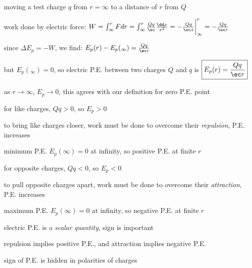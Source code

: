 moving a test charge $q$ from $r=\infty$ to a distance of $r$ from $Q$

\begin{center}
\end{center}

work done by electric force: $W=\int^r_\infty F dr = \int^r_\infty \frac{Qq}{\ec} \frac{\dd x}{x^2} = - \frac{Qq}{\ec x}\bigg|^r_\infty = - \frac{Qq}{\ec r} $

\eqyskip

since $\Delta E_p=-W$, we find: $E_p(r) - E_p(_\infty) = \frac{Qq}{\ec r}$

but $E_p(_\infty) = 0$,  so electric P.E. between two charges $Q$ and $q$ is $\boxed{E_p(r) = \frac{Qq}{\ec r}}$

\cmt as $r \to \infty$, $E_p \to 0$, this agrees with our definition for zero P.E. point

\cmt for like charges, $Qq > 0$, so $E_p > 0$

to bring like charges closer, work must be done to overcome their \emph{repulsion}, P.E. increases

minimum P.E. $E_p(\infty)=0$ at infinity, so positive P.E. at finite $r$

\cmt for opposite charges, $Qq < 0$, so $E_p < 0$

to pull opposite charges apart, work must be done to overcome their \emph{attraction}, P.E. increases

maximum P.E. $E_p(\infty)=0$ at infinity, so negative P.E. at finite $r$

\cmt electric P.E. is a \emph{scalar quantity}, sign is important

repulsion implies positive P.E., and attraction implies negative P.E.

sign of P.E. is hidden in polarities of charges


	
